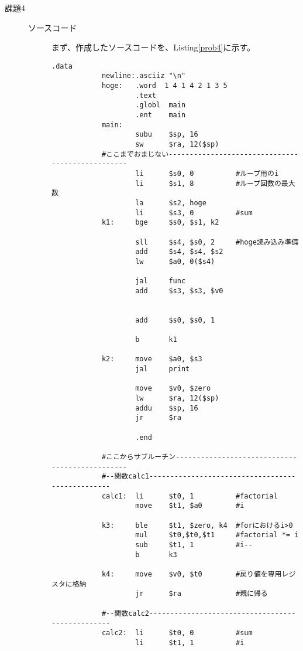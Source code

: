 \documentclass{jsarticle}
\begin{document}
\begin{description}
        \item[課題4]
        \begin{description}
            \item[ソースコード]
            まず、作成したソースコードを、Listing\ref{prob4}に示す。
            \begin{lstlisting}[caption=課題4のソースコード, label=prob4]
                    .data
            newline:.asciiz "\n"
            hoge:   .word  1 4 1 4 2 1 3 5
                    .text
                    .globl  main
                    .ent    main
            main:
                    subu    $sp, 16
                    sw      $ra, 12($sp)
            #ここまでおまじない-------------------------------------------------
                    li      $s0, 0          #ループ用のi
                    li      $s1, 8          #ループ回数の最大数
                    la      $s2, hoge
                    li      $s3, 0          #sum
            k1:     bge     $s0, $s1, k2

                    sll     $s4, $s0, 2     #hoge読み込み準備
                    add     $s4, $s4, $s2
                    lw      $a0, 0($s4)

                    jal     func
                    add     $s3, $s3, $v0


                    add     $s0, $s0, 1

                    b       k1

            k2:     move    $a0, $s3
                    jal     print

                    move    $v0, $zero
                    lw      $ra, 12($sp)
                    addu    $sp, 16
                    jr      $ra

                    .end

            #ここからサブルーチン-----------------------------------------------
            #--関数calc1-------------------------------------------------
            calc1:  li      $t0, 1          #factorial
                    move    $t1, $a0        #i

            k3:     ble     $t1, $zero, k4  #forにおけるi>0
                    mul     $t0,$t0,$t1     #factorial *= i
                    sub     $t1, 1          #i--
                    b       k3

            k4:     move    $v0, $t0        #戻り値を専用レジスタに格納
                    jr      $ra             #親に帰る

            #--関数calc2-------------------------------------------------
            calc2:  li      $t0, 0          #sum
                    li      $t1, 1          #i


\end{lstlisting}
\end{description}
\end{description}
\end{document}
